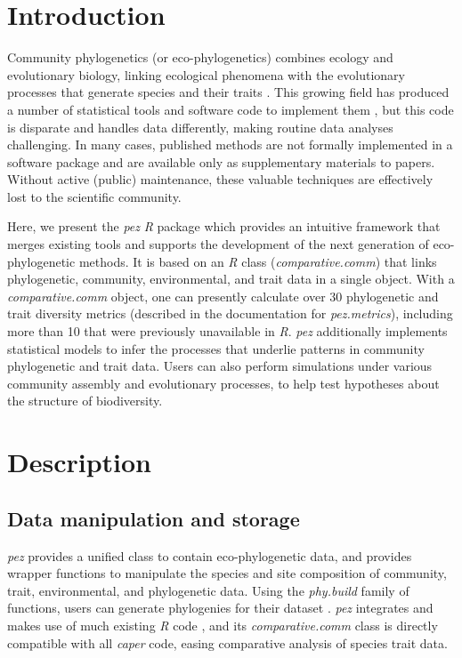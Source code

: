 \documentclass{bioinfo}
\begin{document}
\section{Introduction}
Community phylogenetics (or eco-phylogenetics) combines ecology and
evolutionary biology, linking ecological phenomena with the
evolutionary processes that generate species and their traits
\citep[see][]{Webb2002}. This growing field has produced a number of
statistical tools and software code to implement them
\citep[\emph{e.g.},][]{Kembel2010}, but this code is disparate and
handles data differently, making routine data analyses challenging. In
many cases, published methods are not formally implemented in a
software package and are available only as supplementary materials to
papers. Without active (public) maintenance, these valuable techniques
are effectively lost to the scientific community.

Here, we present the \emph{pez} \emph{R} \citep{R2015} package which
provides an intuitive framework that merges existing tools and
supports the development of the next generation of eco-phylogenetic
methods. It is based on an \emph{R} class (\emph{comparative.comm})
that links phylogenetic, community, environmental, and trait data in a
single object. With a \emph{comparative.comm} object, one can
presently calculate over 30 phylogenetic and trait diversity metrics
(described in the documentation for \emph{pez.metrics}), including
more than 10 that were previously unavailable in \emph{R}. \emph{pez}
additionally implements statistical models
\citep{Cavender-Bares2004,Ives2011,Rafferty2013} to infer the
processes that underlie patterns in community phylogenetic and trait
data. Users can also perform simulations under various community
assembly and evolutionary processes, to help test hypotheses about the
structure of biodiversity.
\section{Description}
\subsection{Data manipulation and storage}
\emph{pez} provides a unified class to contain eco-phylogenetic data,
and provides wrapper functions to manipulate the species and site
composition of community, trait, environmental, and phylogenetic
data. Using the \emph{phy.build} family of functions, users can
generate phylogenies for their dataset \citep[making use of methods
previously implemented in \emph{phyloGenerator};][]{Pearse2013}.
\emph{pez} integrates and makes use of much existing \emph{R} code
\citep{Bortolussi2012,Genz2013,Koenker2015,Labierte2014,Oksanen2015,Paradis2004},
and its \emph{comparative.comm} class is directly compatible with all
\emph{caper} \citep{Orme2013} code, easing comparative analysis of
species trait data.
\end{document}
